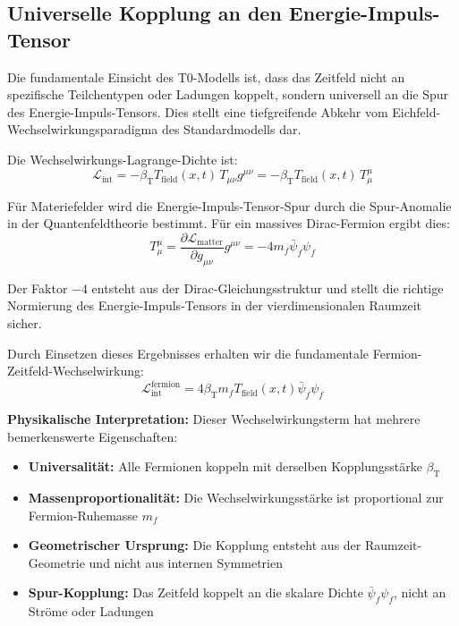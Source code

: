 \documentclass[12pt,a4paper]{article}
\newcommand{\Tfield}{T_{\text{field}}(x,t)}
\newcommand{\betaT}{\beta_{\text{T}}}
\begin{document}
	\subsection{Universelle Kopplung an den Energie-Impuls-Tensor}
	
	Die fundamentale Einsicht des T0-Modells ist, dass das Zeitfeld nicht an spezifische Teilchentypen oder Ladungen koppelt, sondern universell an die Spur des Energie-Impuls-Tensors. Dies stellt eine tiefgreifende Abkehr vom Eichfeld-Wechselwirkungsparadigma des Standardmodells dar.
	
	Die Wechselwirkungs-Lagrange-Dichte ist:
	\begin{equation}
		\mathcal{L}_{\text{int}} = -\betaT \Tfield \, T_{\mu\nu} g^{\mu\nu} = -\betaT \Tfield \, T^\mu_\mu
	\end{equation}
	
	Für Materiefelder wird die Energie-Impuls-Tensor-Spur durch die Spur-Anomalie in der Quantenfeldtheorie bestimmt. Für ein massives Dirac-Fermion ergibt dies:
	\begin{equation}
		T^\mu_\mu = \frac{\partial \mathcal{L}_{\text{matter}}}{\partial g_{\mu\nu}} g^{\mu\nu} = -4m_f \bar{\psi}_f \psi_f
	\end{equation}
	
	Der Faktor $-4$ entsteht aus der Dirac-Gleichungsstruktur und stellt die richtige Normierung des Energie-Impuls-Tensors in der vierdimensionalen Raumzeit sicher.
	
	Durch Einsetzen dieses Ergebnisses erhalten wir die fundamentale Fermion-Zeitfeld-Wechselwirkung:
	\begin{equation}
		\mathcal{L}_{\text{int}}^{\text{fermion}} = 4\betaT m_f \Tfield \bar{\psi}_f \psi_f
	\end{equation}
	
	\textbf{Physikalische Interpretation:} Dieser Wechselwirkungsterm hat mehrere bemerkenswerte Eigenschaften:
	\begin{itemize}
		\item \textbf{Universalität:} Alle Fermionen koppeln mit derselben Kopplungsstärke $\betaT$
		\item \textbf{Massenproportionalität:} Die Wechselwirkungsstärke ist proportional zur Fermion-Ruhemasse $m_f$
		\item \textbf{Geometrischer Ursprung:} Die Kopplung entsteht aus der Raumzeit-Geometrie und nicht aus internen Symmetrien
		\item \textbf{Spur-Kopplung:} Das Zeitfeld koppelt an die skalare Dichte $\bar{\psi}_f \psi_f$, nicht an Ströme oder Ladungen
	\end{itemize}
	
\end{document}
